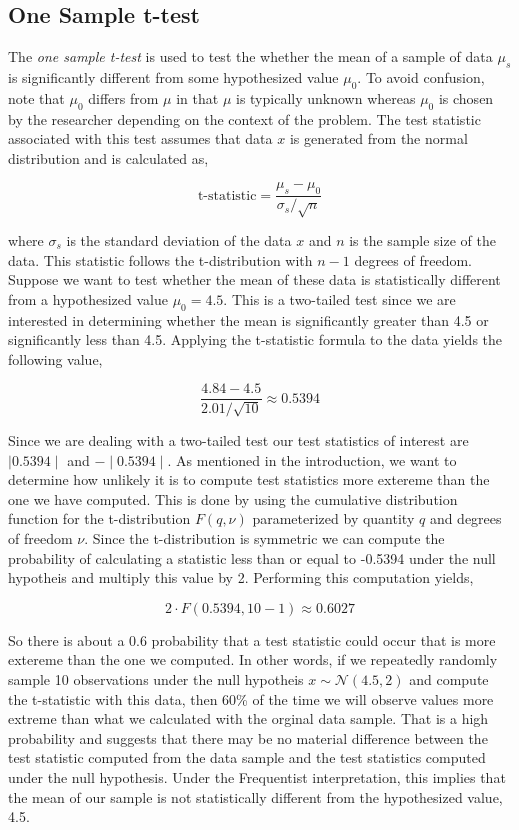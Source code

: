 \documentclass[12pt]{article}
\begin{document}
\subsection{One Sample t-test}

The \emph{one sample t-test} is used to test the whether the mean of a sample of data $\mu_s$ is significantly different from some hypothesized value $\mu_0$. To avoid confusion, note that $\mu_0$ differs from $\mu$ in that $\mu$ is typically unknown whereas $\mu_0$ is chosen by the researcher depending on the context of the problem. The test statistic associated with this test assumes that data $x$ is generated from the normal distribution and is calculated as,

$$
\mbox{t-statistic} = \frac{\mu_s-\mu_0}{\sigma_s/\sqrt{n}}
$$

\noindent where $\sigma_s$ is the standard deviation of the data $x$ and $n$ is the sample size of the data. This statistic follows the t-distribution with $n-1$ degrees of freedom. \\

\noindent Suppose we want to test whether the mean of these data is statistically different from a hypothesized value $\mu_0 = 4.5$. This is a two-tailed test since we are interested in determining whether the mean is significantly greater than 4.5 or significantly less than 4.5. Applying the t-statistic formula to the data yields the following value,

$$
\frac{4.84-4.5}{2.01/\sqrt{10}} \approx 0.5394
$$

\noindent Since we are dealing with a two-tailed test our test statistics of interest are $\mid 0.5394 \mid$ and $-\mid 0.5394 \mid$. As mentioned in the introduction, we want to determine how unlikely it is to compute test statistics more extereme than the one we have computed. This is done by using the cumulative distribution function for the t-distribution $F(q, \nu)$ parameterized by quantity $q$ and degrees of freedom $\nu$. Since the t-distribution is symmetric we can compute the probability of calculating a statistic less than or equal to -0.5394 under the null hypotheis and multiply this value by 2. Performing this computation yields,

$$
2 \cdot F(0.5394, 10-1) \approx 0.6027
$$

\noindent So there is about a 0.6 probability that a test statistic could occur that is more extereme than the one we computed. In other words, if we repeatedly randomly sample 10 observations under the null hypotheis $x \sim \mathcal{N}(4.5, 2)$ and compute the t-statistic with this data, then 60\% of the time we will observe values more extreme than what we calculated with the orginal data sample. That is a high probability and suggests that there may be no material difference between the test statistic computed from the data sample and the test statistics computed under the null hypothesis. Under the Frequentist interpretation, this implies that the mean of our sample is not statistically different from the hypothesized value, 4.5. \\
\end{document}
